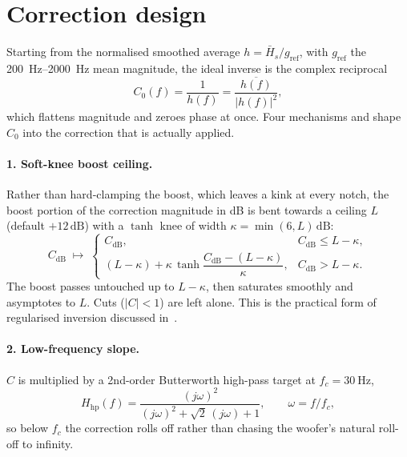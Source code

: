 \section{Correction design}\label{sec:thcorrection}
Starting from the normalised smoothed average $h = \bar H_s / g_{\mathrm{ref}}$, with $g_{\mathrm{ref}}$ the \SIrange{200}{2000}{\hertz} mean magnitude, the ideal inverse is the complex reciprocal
\begin{equation}
  C_0(f) = \frac{1}{h(f)} = \frac{\overline{h(f)}}{|h(f)|^{2}} ,
  \label{eq:inverse}
\end{equation}
which flattens magnitude and zeroes phase at once. Four mechanisms  and shape $C_0$ into the correction that is actually applied.

\paragraph{1. Soft-knee boost ceiling.} Rather than hard-clamping the boost, which leaves a kink at every notch, the boost portion of the correction magnitude in dB is bent towards a ceiling $L$ (default $+12\,\si{\dB}$) with a $\tanh$ knee of width $\kappa=\min(6,L)\,\si{\dB}$:
\begin{equation}
  C_{\mathrm{dB}} \;\longmapsto\;
  \begin{cases}
    C_{\mathrm{dB}}, & C_{\mathrm{dB}} \le L-\kappa,\\[2pt]
    (L-\kappa) + \kappa\,\tanh\!\dfrac{C_{\mathrm{dB}}-(L-\kappa)}{\kappa}, & C_{\mathrm{dB}} > L-\kappa.
  \end{cases}
\end{equation}
The boost passes untouched up to $L-\kappa$, then saturates smoothly and asymptotes to $L$. Cuts ($|C|<1$) are left alone. This is the practical form of regularised inversion discussed in~\cite{Kirkeby1999}.

\paragraph{2. Low-frequency slope.} $C$ is multiplied by a 2nd-order Butterworth high-pass target at $f_c=\SI{30}{\hertz}$,
\begin{equation}
  H_{\mathrm{hp}}(f) = \frac{(j\omega)^2}{(j\omega)^2 + \sqrt{2}\,(j\omega) + 1},
  \qquad \omega = f/f_c ,
\end{equation}
so below $f_c$ the correction rolls off rather than chasing the woofer's natural roll-off to infinity.

